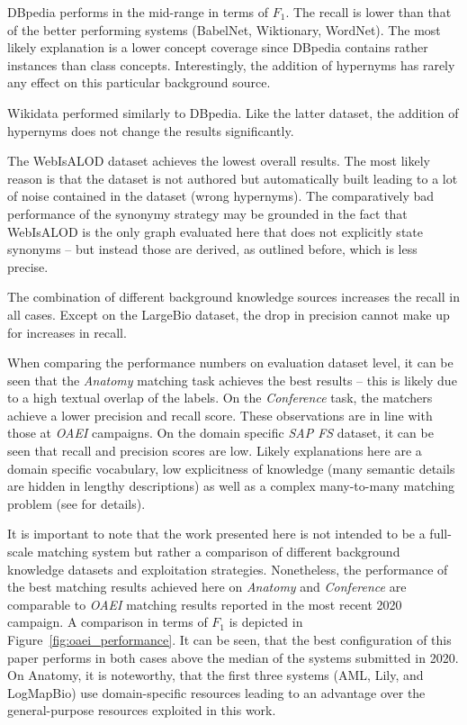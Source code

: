 \documentclass[runningheads]{llncs}
\begin{document}
DBpedia performs in the mid-range in terms of $F_1$. The recall is lower than that of the better performing systems (BabelNet, Wiktionary, WordNet). The most likely explanation is a lower concept coverage since DBpedia contains rather instances than class concepts. Interestingly, the addition of hypernyms has rarely any effect on this particular background source.

Wikidata performed similarly to DBpedia. Like the latter dataset, the addition of hypernyms does not change the results significantly. 

The WebIsALOD dataset achieves the lowest overall results. The most likely reason is that the dataset is not authored but automatically built leading to a lot of noise contained in the dataset (wrong hypernyms). The comparatively bad performance of the synonymy strategy may be grounded in the fact that WebIsALOD is the only graph evaluated here that does not explicitly state synonyms -- but instead those are derived, as outlined before, which is less precise.

The combination of different background knowledge sources increases the recall in all cases. Except on the LargeBio dataset, the drop in precision cannot make up for increases in recall.

When comparing the performance numbers on evaluation dataset level, it can be seen that the \textit{Anatomy} matching task achieves the best results -- this is likely due to a high textual overlap of the labels. On the \textit{Conference} task, the matchers achieve a lower precision and recall score. These observations are in line with those at \textit{OAEI} campaigns. On the domain specific \textit{SAP FS} dataset, it can be seen that recall and precision scores are low. Likely explanations here are a domain specific vocabulary, low explicitness of knowledge (many semantic details are hidden in lengthy descriptions) as well as a complex many-to-many matching problem (see \cite{banking_evaluation} for details).   

It is important to note that the work presented here is not intended to be a full-scale matching system but rather a comparison of different background knowledge datasets and exploitation strategies. Nonetheless, the performance of the best matching results achieved here on \textit{Anatomy} and \textit{Conference} are comparable to \textit{OAEI} matching results reported in the most recent 2020 campaign. A comparison in terms of $F_1$ is depicted in Figure~\ref{fig:oaei_performance}. It can be seen, that the best configuration of this paper performs in both cases above the median of the systems submitted in 2020. On Anatomy, it is noteworthy, that the first three systems (AML, Lily, and LogMapBio) use domain-specific resources leading to an advantage over the general-purpose resources exploited in this work.
\end{document}
